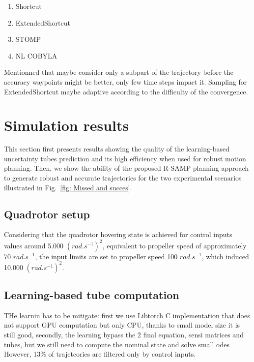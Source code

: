 \begin{enumerate}
    \item Shortcut
    \item ExtendedShortcut
    \item STOMP
    \item NL COBYLA
\end{enumerate}

Mentionned that maybe consider only a subpart of the trajectory before the accuracy waypoints might be better, only few time steps impact it.
Sampling for ExtendedShortcut maybe adaptive according to the difficulty of the convergence.

\section{Simulation results} \label{sec:SimuResults}

This section first presents results showing the quality of the learning-based uncertainty tubes prediction and its high efficiency when used for robust motion planning. 
Then, we show the ability of the proposed R-SAMP planning approach to generate robust 
and accurate trajectories for the two experimental scenarios illustrated in Fig.~\ref{fig: Missed and succes}.

\subsection{Quadrotor setup} \label{sec:quad_setup}

Considering that the quadrotor hovering state is achieved for control inputs values around 5.000 $(rad.s^{-1})^2$, equivalent to propeller speed of approximately 70 $rad.s^{-1}$, the input limits are set to propeller speed 100 $rad.s^{-1}$, which induced 10.000 $(rad.s^{-1})^2$.

\subsection{Learning-based tube computation} \label{sec:NNresult}

THe learnin has to be mitigate: first we use Libtorch C implementation that does not support GPU computation but only CPU, thanks to small model size it is still good, secondly, the learning bypass the 2 final equation, sensi matrices and tubes, but we still need to compute the nominal state and solve small odes
However, 13\% of trajetcories are filtered only by control inputs.

